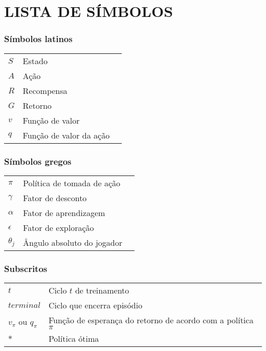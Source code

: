 




\chapter*{LISTA DE SÍMBOLOS}


\subsection*{Símbolos latinos}

\begin{tabular}{p{}p{}>{\PreserveBacklash\raggedleft}p{}}
	$S$ & Estado \tabularnewline
	$A$ & Ação \tabularnewline
	$R$ & Recompensa \tabularnewline
	$G$ & Retorno \tabularnewline
	$v$ & Função de valor \tabularnewline
	$q$ & Função de valor da ação\tabularnewline
 \end{tabular}

\subsection*{Símbolos gregos}

\begin{tabular}{p{}p{}>{\PreserveBacklash\raggedleft}p{}}
$\pi$ & Política de tomada de ação \tabularnewline
$\gamma$ & Fator de desconto \tabularnewline
$\alpha$ & Fator de aprendizagem \tabularnewline
$\epsilon$ & Fator de exploração \tabularnewline
$\theta_j$ & Ângulo absoluto do jogador \tabularnewline
\end{tabular}

\subsection*{Subscritos}

\begin{tabular}{p{}p{}}
$t$  & Ciclo $t$ de treinamento \tabularnewline
$terminal$  & Ciclo que encerra episódio \tabularnewline
$v_\pi$ ou  $q_\pi$ & Função de esperança do retorno de acordo com a política $\pi$ \tabularnewline
$*$  & Política ótima \tabularnewline
\end{tabular}

